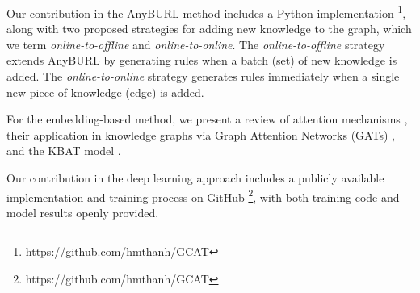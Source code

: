 Our contribution in the AnyBURL method includes a Python implementation \footnote{https://github.com/hmthanh/GCAT}, along with two proposed strategies for adding new knowledge to the graph, which we term \textit{online-to-offline} and \textit{online-to-online}. The \textit{online-to-offline} strategy extends AnyBURL by generating rules when a batch (set) of new knowledge is added. The \textit{online-to-online} strategy generates rules immediately when a single new piece of knowledge (edge) is added.

For the embedding-based method, we present a review of attention mechanisms \cite{vaswani2017attention}, their application in knowledge graphs via Graph Attention Networks (GATs) \cite{velivckovic2017graph}, and the KBAT model \cite{nathani2019learning}.

Our contribution in the deep learning approach includes a publicly available implementation and training process on GitHub \footnote{https://github.com/hmthanh/GCAT}, with both training code and model results openly provided.
